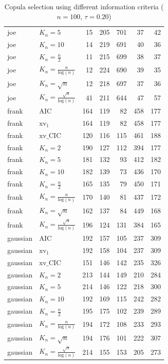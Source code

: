 \begin{table}[htbp]
\begin{tabular}{llrrrrr}
  joe & $K_{n}=5$ & 15 & 205 & 701 & 37 & 42 \\ 
  joe & $K_{n}=10$ & 14 & 219 & 691 & 40 & 36 \\ 
  joe & $K_{n}=\tfrac{n}{2}$ & 11 & 215 & 699 & 38 & 37 \\ 
  joe & $K_{n}=\tfrac{n}{\text{log}(n)}$ & 12 & 224 & 690 & 39 & 35 \\ 
  joe & $K_{n}=\sqrt{n}$ & 12 & 218 & 697 & 37 & 36 \\ 
  joe & $K_{n}=\tfrac{\sqrt{n}}{\text{log}(n)}$ & 41 & 211 & 644 & 47 & 57 \\ 
   \hdashline
frank & AIC & 164 & 119 & 82 & 458 & 177 \\ 
  frank & $\text{xv}_{1}$ & 164 & 119 & 82 & 458 & 177 \\ 
  frank & $\text{xv}\_\text{CIC}$ & 120 & 116 & 115 & 461 & 188 \\ 
  frank & $K_{n}=2$ & 190 & 127 & 112 & 394 & 177 \\ 
  frank & $K_{n}=5$ & 181 & 132 & 93 & 412 & 182 \\ 
  frank & $K_{n}=10$ & 182 & 139 & 73 & 436 & 170 \\ 
  frank & $K_{n}=\tfrac{n}{2}$ & 165 & 135 & 79 & 450 & 171 \\ 
  frank & $K_{n}=\tfrac{n}{\text{log}(n)}$ & 170 & 140 & 81 & 437 & 172 \\ 
  frank & $K_{n}=\sqrt{n}$ & 162 & 137 & 84 & 449 & 168 \\ 
  frank & $K_{n}=\tfrac{\sqrt{n}}{\text{log}(n)}$ & 196 & 124 & 131 & 384 & 165 \\ 
   \hdashline
gaussian & AIC & 192 & 157 & 105 & 237 & 309 \\ 
  gaussian & $\text{xv}_{1}$ & 192 & 158 & 104 & 237 & 309 \\ 
  gaussian & $\text{xv}\_\text{CIC}$ & 151 & 146 & 142 & 235 & 326 \\ 
  gaussian & $K_{n}=2$ & 213 & 144 & 149 & 210 & 284 \\ 
  gaussian & $K_{n}=5$ & 214 & 146 & 122 & 218 & 300 \\ 
  gaussian & $K_{n}=10$ & 192 & 169 & 115 & 242 & 282 \\ 
  gaussian & $K_{n}=\tfrac{n}{2}$ & 195 & 175 & 102 & 239 & 289 \\ 
  gaussian & $K_{n}=\tfrac{n}{\text{log}(n)}$ & 194 & 172 & 108 & 233 & 293 \\ 
  gaussian & $K_{n}=\sqrt{n}$ & 194 & 176 & 101 & 222 & 307 \\ 
  gaussian & $K_{n}=\tfrac{\sqrt{n}}{\text{log}(n)}$ & 214 & 155 & 153 & 205 & 273 \\ 
   \hline
\end{tabular}
\caption{Copula selection using different information criteria ($n = 100$, $\tau = 0.20$)} 
\end{table}


